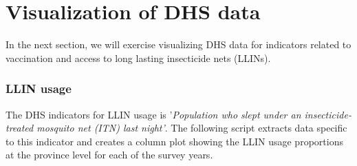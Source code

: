 \documentclass[
  letterpaper,
  DIV=11,
  numbers=noendperiod]{scrreprt}
\newenvironment{Shaded}{\begin{snugshade}}{\end{snugshade}}
\newcommand{\AttributeTok}[1]{\textcolor[rgb]{0.40,0.45,0.13}{#1}}
\newcommand{\CommentTok}[1]{\textcolor[rgb]{0.37,0.37,0.37}{#1}}
\newcommand{\DecValTok}[1]{\textcolor[rgb]{0.68,0.00,0.00}{#1}}
\newcommand{\FunctionTok}[1]{\textcolor[rgb]{0.28,0.35,0.67}{#1}}
\newcommand{\NormalTok}[1]{\textcolor[rgb]{0.00,0.23,0.31}{#1}}
\newcommand{\OtherTok}[1]{\textcolor[rgb]{0.00,0.23,0.31}{#1}}
\newcommand{\SpecialCharTok}[1]{\textcolor[rgb]{0.37,0.37,0.37}{#1}}
\newcommand{\StringTok}[1]{\textcolor[rgb]{0.13,0.47,0.30}{#1}}
\begin{document}
\begin{Shaded}
\end{Shaded}


\chapter{Visualization of DHS data}\label{visualization-of-dhs-data}

In the next section, we will exercise visualizing DHS data for
indicators related to vaccination and access to long lasting insecticide
nets (LLINs).

\subsection{LLIN usage}\label{llin-usage}

The DHS indicators for LLIN usage is '\emph{Population who slept under
an insecticide-treated mosquito net (ITN) last night'}. The following
script extracts data specific to this indicator and creates a column
plot showing the LLIN usage proportions at the province level for each
of the survey years.~
\end{document}
